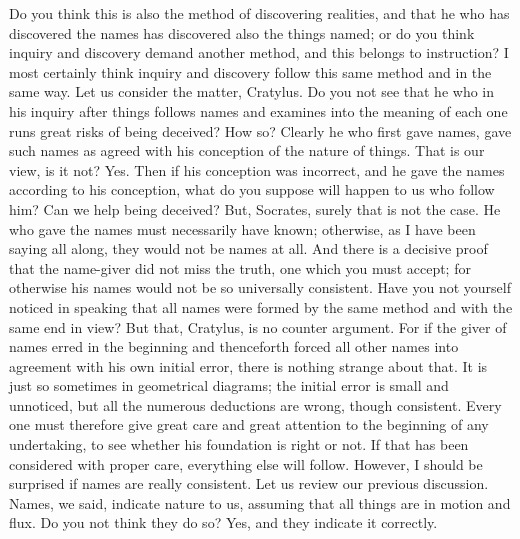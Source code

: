 {{{{{\socratesspeaks
Do you think this is also the method of discovering realities, and that he who has discovered the names has discovered also the things named; or do you think inquiry and discovery demand another method, and this belongs to instruction?
\cratylusspeaks
I most certainly think inquiry and discovery follow this same method and in the same way.
\socratesspeaks
Let us consider the matter, Cratylus. Do you not see that he who in his inquiry after things follows names  and examines into the meaning of each one runs great risks of being deceived?
\cratylusspeaks
How so?
\socratesspeaks
Clearly he who first gave names, gave such names as agreed with his conception of the nature of things. That is our view, is it not?
\cratylusspeaks
Yes.
\socratesspeaks
Then if his conception was incorrect, and he gave the names according to his conception, what do you suppose will happen to us who follow him? Can we help being deceived?
\cratylusspeaks
But, Socrates, surely that is not the case.  He who gave the names must necessarily have known; otherwise, as I have been saying all along, they would not be names at all. And there is a decisive proof that the name-giver did not miss the truth, one which you must accept; for otherwise his names would not be so universally consistent. Have you not yourself noticed in speaking that all names were formed by the same method and with the same end in view?
\socratesspeaks
But that, Cratylus, is no counter argument. For if the giver of names erred in the beginning  and thenceforth forced all other names into agreement with his own initial error, there is nothing strange about that. It is just so sometimes in geometrical diagrams; the initial error is small and unnoticed, but all the numerous deductions are wrong, though consistent. Every one must therefore give great care and great attention to the beginning of any undertaking, to see whether his foundation is right or not. If that has been considered with proper care, everything else will follow.  However, I should be surprised if names are really consistent. Let us review our previous discussion. Names, we said, indicate nature to us, assuming that all things are in motion and flux. Do you not think they do so? 
\cratylusspeaks
Yes, and they indicate it correctly.
\socratesspeaks
}}}}}
